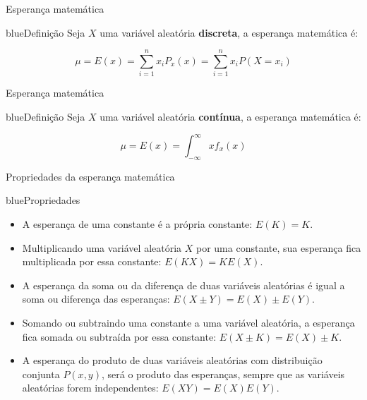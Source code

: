 \documentclass[9pt]{beamer}
\begin{document}
\begin{frame}{Esperança matemática}{}

\begin{block}{blue}{Definição}
Seja $X$ uma variável aleatória \textbf{discreta}, a esperança
matemática é:

$$\mu = E(x) = \displaystyle{\sum_{i=1}^n}x_iP_x(x) =
\displaystyle{\sum_{i=1}^n} x_i P(X=x_i)$$

\end{block}

\end{frame}

\begin{frame}{Esperança matemática}{}

\begin{block}{blue}{Definição}
Seja $X$ uma variável aleatória \textbf{contínua}, a esperança
matemática é:

$$\mu = E(x) = \displaystyle{\int_{-\infty}^\infty}xf_x(x)$$

\end{block}

\end{frame}


\begin{frame}{Propriedades da esperança matemática}{}

\begin{block}{blue}{Propriedades}
\begin{itemize}
\item A esperança de uma constante é a própria constante: $E(K) = K$.
\item Multiplicando uma variável aleatória $X$ por uma constante,
sua esperança fica multiplicada por essa constante: $E(KX) = KE(X)$.
\item A esperança da soma ou da diferença de duas variáveis aleatórias é
igual a soma ou diferença das esperanças: $E(X \pm Y) = E(X) \pm E(Y)$.
\item Somando ou subtraindo uma constante a uma variável aleatória,
a esperança fica somada ou subtraída por essa constante:
$E(X \pm K) = E(X) \pm K$.
\item A esperança do produto de duas variáveis aleatórias com
distribuição conjunta $P(x, y)$, será o produto das esperanças,
sempre que as variáveis aleatórias forem independentes:
$ E(XY) = E(X)E(Y)$.
\end{itemize}

\end{block}

\end{frame}
\end{document}
